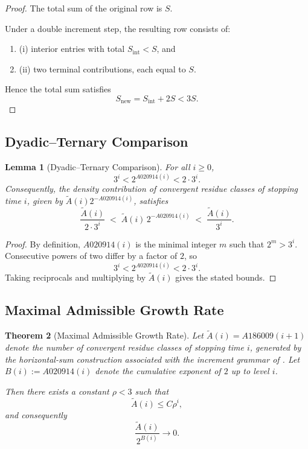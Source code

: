 \documentclass[12pt, oneside]{article}
\numberwithin{equation}{section}
\theoremstyle{definition}
\theoremstyle{plain}
\newtheorem{theorem}{Theorem}[section]
\newtheorem{lemma}[theorem]{Lemma}
\theoremstyle{remark}
\begin{document}
\begin{proof}
The total sum of the original row is $S$.

Under a double increment step, the resulting row consists of:
\begin{enumerate}
    \item (i) interior entries with total $S_{\mathrm{int}} < S$, and
    \item (ii) two terminal contributions, each equal to $S$.
\end{enumerate}

Hence the total sum satisfies
\[
S_{\mathrm{new}} = S_{\mathrm{int}} + 2S < 3S.
\]
\end{proof}

\subsection{Dyadic–Ternary Comparison}
\begin{lemma}[Dyadic–Ternary Comparison]
\label{lem:uniform-control}
For all $i \ge 0$,
\[
3^i < 2^{A020914(i)} < 2\cdot 3^i.
\]
Consequently, the density contribution of convergent residue classes of
stopping time $i$, given by \(\widetilde A(i) 2^{-A020914(i)}\), satisfies
\[
\frac{\widetilde A(i)}{2 \cdot 3^i}
\;<\;
\widetilde A(i)\,2^{-A020914(i)}
\;<\;
\frac{\widetilde A(i)}{3^i}.
\]
\end{lemma}

\begin{proof}
By definition, $A020914(i)$ is the minimal integer $m$ such that $2^m > 3^i$.
Consecutive powers of two differ by a factor of $2$, so
\[
3^i < 2^{A020914(i)} < 2 \cdot 3^i.
\]
Taking reciprocals and multiplying by $\widetilde A(i)$ gives the stated bounds.
\end{proof}

\subsection{Maximal Admissible Growth Rate}
\begin{theorem}[Maximal Admissible Growth Rate]
\label{thm:maximal-growth}
Let $\widetilde A(i) = A186009(i+1)$ denote the number of convergent residue classes
of stopping time $i$, generated by the horizontal-sum construction associated with
the increment grammar of .  Let $B(i) := A020914(i)$ denote the
cumulative exponent of $2$ up to level $i$.  

Then there exists a constant $\rho < 3$ such that
\[
\widetilde A(i) \le C \rho^i,
\]
and consequently
\[
\frac{\widetilde A(i)}{2^{B(i)}} \to 0.
\]
\end{theorem}
\end{document}

